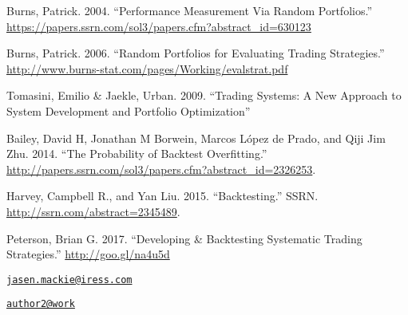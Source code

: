 Burns, Patrick. 2004. ``Performance Measurement Via Random Portfolios.''
\url{https://papers.ssrn.com/sol3/papers.cfm?abstract_id=630123}

Burns, Patrick. 2006. ``Random Portfolios for Evaluating Trading
Strategies.''
\url{http://www.burns-stat.com/pages/Working/evalstrat.pdf}

Tomasini, Emilio \& Jaekle, Urban. 2009. ``Trading Systems: A New
Approach to System Development and Portfolio Optimization''

Bailey, David H, Jonathan M Borwein, Marcos López de Prado, and Qiji Jim
Zhu. 2014. ``The Probability of Backtest Overfitting.''
\url{http://papers.ssrn.com/sol3/papers.cfm?abstract_id=2326253}.

Harvey, Campbell R., and Yan Liu. 2015. ``Backtesting.'' SSRN.
\url{http://ssrn.com/abstract=2345489}.

Peterson, Brian G. 2017. ``Developing \& Backtesting Systematic Trading
Strategies.'' \url{http://goo.gl/na4u5d}


\address{%
Jasen Mackie\\
Affiliation\\
line 1\\ line 2\\
}
\href{mailto:jasen.mackie@iress.com}{\nolinkurl{jasen.mackie@iress.com}}

\address{%
Brian G. Peterson\\
Affiliation\\
line 1\\ line 2\\
}
\href{mailto:author2@work}{\nolinkurl{author2@work}}

